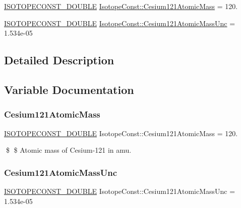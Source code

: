 \begin{DoxyCompactItemize}
\item 
\mbox{\hyperlink{group___isotope_const-_macros_ga8f45a7272ce02c0b4c65c44636ed719a}{I\+S\+O\+T\+O\+P\+E\+C\+O\+N\+S\+T\+\_\+\+D\+O\+U\+B\+LE}} \mbox{\hyperlink{group___isotope_const-_cesium-_cs121_ga2edde61b34e504a75424a65712cd1f63}{Isotope\+Const\+::\+Cesium121\+Atomic\+Mass}} = 120.
\item 
\mbox{\hyperlink{group___isotope_const-_macros_ga8f45a7272ce02c0b4c65c44636ed719a}{I\+S\+O\+T\+O\+P\+E\+C\+O\+N\+S\+T\+\_\+\+D\+O\+U\+B\+LE}} \mbox{\hyperlink{group___isotope_const-_cesium-_cs121_ga0abc5ca8abe2635dd39e2195b3ce52b1}{Isotope\+Const\+::\+Cesium121\+Atomic\+Mass\+Unc}} = 1.\+534e-\/05
\end{DoxyCompactItemize}


\subsection{Detailed Description}


\subsection{Variable Documentation}
\mbox{\label{group___isotope_const-_cesium-_cs121_ga2edde61b34e504a75424a65712cd1f63}} 
\subsubsection{\texorpdfstring{Cesium121\+Atomic\+Mass}{Cesium121AtomicMass}}
{\footnotesize\ttfamily \mbox{\hyperlink{group___isotope_const-_macros_ga8f45a7272ce02c0b4c65c44636ed719a}{I\+S\+O\+T\+O\+P\+E\+C\+O\+N\+S\+T\+\_\+\+D\+O\+U\+B\+LE}} Isotope\+Const\+::\+Cesium121\+Atomic\+Mass = 120.}

\$ \$ Atomic mass of Cesium-\/121 in amu. \mbox{\label{group___isotope_const-_cesium-_cs121_ga0abc5ca8abe2635dd39e2195b3ce52b1}} 
\subsubsection{\texorpdfstring{Cesium121\+Atomic\+Mass\+Unc}{Cesium121AtomicMassUnc}}
{\footnotesize\ttfamily \mbox{\hyperlink{group___isotope_const-_macros_ga8f45a7272ce02c0b4c65c44636ed719a}{I\+S\+O\+T\+O\+P\+E\+C\+O\+N\+S\+T\+\_\+\+D\+O\+U\+B\+LE}} Isotope\+Const\+::\+Cesium121\+Atomic\+Mass\+Unc = 1.\+534e-\/05}

